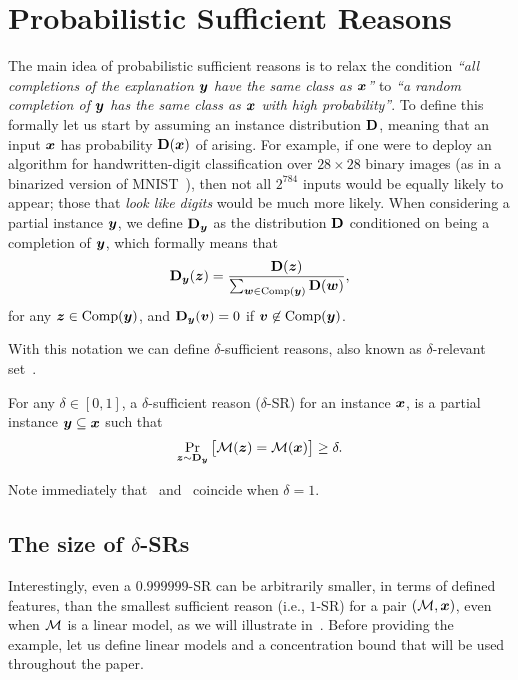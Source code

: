 \section{Probabilistic Sufficient Reasons}

The main idea of probabilistic sufficient reasons is to relax the condition \emph{``all completions of the explanation ${\bm{y}}$ have the same class as ${\bm{x}}$''} to \emph{``a random completion of ${\bm{y}}$ has the same class as ${\bm{x}}$ with high probability''}. To define this formally let us start by assuming an instance distribution $\mathbf{D}$, meaning that an input ${\bm{x}}$ has probability $\mathbf{D}({\bm{x}})$ of arising. For example, if one were to deploy an algorithm for handwritten-digit classification over $28 \times 28$ binary images (as in a binarized version of MNIST~\cite{deng2012mnist}), then not all $2^{784}$ inputs would be equally likely to appear; those that \emph{look like digits} would be much more likely.
When considering a partial instance ${\bm{y}}$, we define $\mathbf{D}_{{\bm{y}}}$ as the distribution $\mathbf{D}$ conditioned on being a completion of ${\bm{y}}$, which formally means that 
\[
	\mathbf{D}_{{\bm{y}}}({\bm{z}}) = \frac{\mathbf{D}({\bm{z}})}{\sum_{{\bm{w}} \in \operatorname{Comp}({\bm{y}})} \mathbf{D}({\bm{w}})},
\]
for any ${\bm{z}} \in \operatorname{Comp}({\bm{y}})$, and $\mathbf{D}_{{\bm{y}}}({\bm{v}}) = 0$ if ${\bm{v}} \not\in \operatorname{Comp}({\bm{y}})$.
 
With this notation we can define $\delta$-sufficient reasons, also known as $\delta$-relevant set~\cite{Izza2021EfficientEW}.
\begin{definition}
	For any $\delta \in [0, 1]$, a $\delta$-sufficient reason ($\delta$-SR) for an instance ${\bm{x}}$, is a partial instance ${\bm{y}} \subseteq {\bm{x}}$ such that
	\[
		\Pr_{{\bm{z}} \sim \mathbf{D}_{{\bm{y}}}}\big[\mathcal{M}({\bm{z}}) = \mathcal{M}({\bm{x}})\big] \geq \delta.
	\]
	\label{def:delta-SR}
\end{definition}
%
Note immediately that~ and~ coincide when $\delta = 1$.
\subsection{The size of $\delta$-SRs}

Interestingly, even a $0.999999$-SR can be arbitrarily smaller, in terms of defined features, than the smallest sufficient reason (i.e., $1$-SR) for a pair $(\mathcal{M}, {\bm{x}})$, even when $\mathcal{M}$ is a linear model, as we will illustrate in~. Before providing the example, let us define linear models and a concentration bound that will be used throughout the paper.

